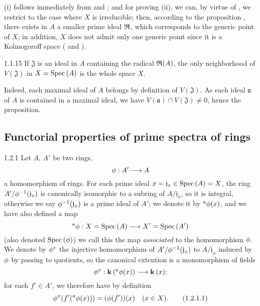 (i) follows immediately from  and ; and for
proving (ii), we can, by virtue of , we restrict to the case where
$X$ is irreducible; then, according to the proposition , there exists
in $A$ a smaller prime ideal $\mathfrak{R}$, which corresponds to the generic point
of $X$; in addition, $X$ does not admit only one generic point since it is a Kolmogoroff
space ( and ).

\begin{envs}[Proposition]{1.1.15}
\label{prop-1.1.1.15}
If $\mathfrak{J}$ is an ideal in $A$ containing the radical $\mathfrak{R}(A)$, the only
neighborhood of $V(\mathfrak{J})$ in $X={\mathop{\mathrm{Spec}}\nolimits}\,(A)$ is the whole space $X$.
\end{envs}

Indeed, each maximal ideal of $A$ belongs by definition of $V(\mathfrak{J})$.
As each ideal $\mathfrak{a}$ of $A$ is contained in a maximal ideal, we have
$V(\mathfrak{a})\cap V(\mathfrak{J})\neq 0$, hence the proposition.

\subsection{Functorial properties of prime spectra of rings}
\label{1-schemes-1.2}       

\begin{env}{1.2.1}
\label{env-1.1.2.1}
Let $A$, $A'$ be two rings,
\[
  \phi:A'\longrightarrow A
\]
a homomorphism of rings. For each prime ideal $x=\mathfrak{j}_x\in{\mathop{\mathrm{Spec}}\nolimits}\,(A)=X$, the
ring $A'/\phi^{-1}(\mathfrak{j}_x)$ is canonically isomorphic to a subring of
$A/\mathfrak{j}_x$, so it is integral, otherwise we say
$\phi^{-1}(\mathfrak{j}_x)$ is a prime ideal of $A'$; we denote it by
${}^a\phi(x)$, and we have also defined a map
\[
  {}^a\phi:X={\mathop{\mathrm{Spec}}\nolimits}\,(A)\longrightarrow X'={\mathop{\mathrm{Spec}}\nolimits}\,(A')
\]
(also denoted ${\mathop{\mathrm{Spec}}\nolimits}\,(\phi)$) we call this the map \emph{associated} to the
homomorphism $\phi$. We denote by $\phi^x$ the injective homomorphism of
$A'/\phi^{-1}(\mathfrak{j}_x)$ to $A/\mathfrak{j}_x$ induced by $\phi$ by
passing to quotients, so the canonical extention is a monomorphism of fields
\[
  \phi^x:\mathbf{k}\,({}^a\phi(x))\longrightarrow\mathbf{k}\,(x);
\]
for each $f'\in A'$, we therefore have by definition
\[
  \phi^x(f'({}^a\phi(x)))=(\phi(f'))(x)\quad(x\in X).
  \tag{1.2.1.1}
\]
\end{env}

